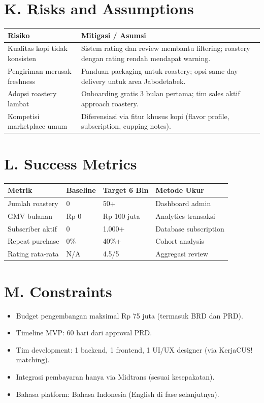 \documentclass[11pt,a4paper]{article}
\begin{document}
\section{K. Risks and Assumptions}
\noindent\small
\begin{tabularx}{\textwidth}{|p{4.2cm}|X|}
\hline
\centering\textbf{Risiko}\arraybackslash & \centering\textbf{Mitigasi / Asumsi}\arraybackslash \\\hline
Kualitas kopi tidak konsisten & Sistem rating dan review membantu filtering; roastery dengan rating rendah mendapat warning. \\\hline
Pengiriman merusak freshness & Panduan packaging untuk roastery; opsi same-day delivery untuk area Jabodetabek. \\\hline
Adopsi roastery lambat & Onboarding gratis 3 bulan pertama; tim sales aktif approach roastery. \\\hline
Kompetisi marketplace umum & Diferensiasi via fitur khusus kopi (flavor profile, subscription, cupping notes). \\\hline
\end{tabularx}\normalsize

\section{L. Success Metrics}
\noindent\small
\begin{tabularx}{\textwidth}{|p{3.2cm}|p{2cm}|p{2.2cm}|X|}
\hline
\centering\textbf{Metrik}\arraybackslash & \centering\textbf{Baseline}\arraybackslash & \centering\textbf{Target 6 Bln}\arraybackslash & \centering\textbf{Metode Ukur}\arraybackslash \\\hline
Jumlah roastery & 0 & 50+ & Dashboard admin \\\hline
GMV bulanan & Rp 0 & Rp 100 juta & Analytics transaksi \\\hline
Subscriber aktif & 0 & 1.000+ & Database subscription \\\hline
Repeat purchase & 0\% & 40\%+ & Cohort analysis \\\hline
Rating rata-rata & N/A & 4.5/5 & Aggregasi review \\\hline
\end{tabularx}\normalsize

\section{M. Constraints}
\begin{itemize}[noitemsep,leftmargin=1.5cm]
\item Budget pengembangan maksimal Rp 75 juta (termasuk BRD dan PRD).
\item Timeline MVP: 60 hari dari approval PRD.
\item Tim development: 1 backend, 1 frontend, 1 UI/UX designer (via KerjaCUS! matching).
\item Integrasi pembayaran hanya via Midtrans (sesuai kesepakatan).
\item Bahasa platform: Bahasa Indonesia (English di fase selanjutnya).
\end{itemize}
\end{document}
